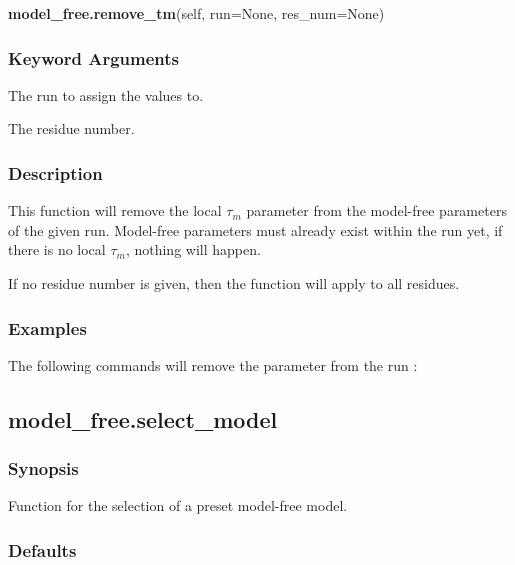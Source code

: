  \textsf{\textbf{model\_free.remove\_tm}(self, run=None, res\_num=None)} 

  
 \subsubsection{Keyword Arguments} 

   The run to assign the values to.   

   The residue number.  

  

  
 \subsubsection{Description} 

 This function will remove the local $\tau_m$ parameter from the model-free parameters of the given run.  Model-free parameters must already exist within the run yet, if there is no local $\tau_m$, nothing will happen. 
  

 If no residue number is given, then the function will apply to all residues. 
  

  
 \subsubsection{Examples} 

 The following commands will remove the parameter  from the run : 
  



  

 \newpage 

 \subsection{model\_free.select\_model} 

  
 \subsubsection{Synopsis} 

 Function for the selection of a preset model-free model. 
  

  
 \subsubsection{Defaults} 

